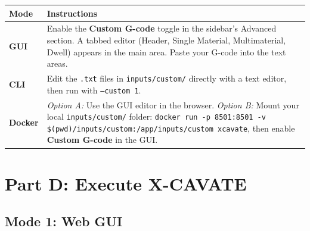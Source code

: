 \documentclass[11pt,letterpaper]{article}
\newcommand{\code}[1]{\texttt{#1}}
\newcommand{\gui}[1]{\textcolor{guicolor}{\textsf{\textbf{#1}}}}
\begin{document}
\begin{longtable}{@{}p{2cm}p{12cm}@{}}
\toprule
\textbf{Mode} & \textbf{Instructions} \\
\midrule
\textbf{GUI} & Enable the \gui{Custom G-code} toggle in the sidebar's Advanced section. A tabbed editor (Header, Single Material, Multimaterial, Dwell) appears in the main area. Paste your G-code into the text areas. \\
\textbf{CLI} & Edit the \code{.txt} files in \code{inputs/custom/} directly with a text editor, then run with \code{--custom 1}. \\
\textbf{Docker} & \textit{Option A:} Use the GUI editor in the browser. \textit{Option B:} Mount your local \code{inputs/custom/} folder: \code{docker run -p 8501:8501 -v \$(pwd)/inputs/custom:/app/inputs/custom xcavate}, then enable \gui{Custom G-code} in the GUI. \\
\bottomrule
\end{longtable}


\section{Part D: Execute X-CAVATE}

\subsection{Mode 1: Web GUI}
\end{document}
